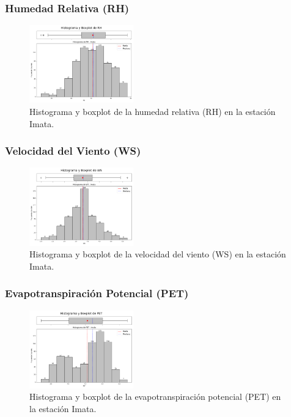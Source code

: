 \subsubsection*{Humedad Relativa (RH)}
\begin{figure}[H]
\centering
\includegraphics[width=0.4\textwidth]{resultados/por_estacion_meteorologica/Imata/RH_histograma.png}
\caption{Histograma y boxplot de la humedad relativa (RH) en la estación Imata.}
\label{fig:imata_RH}
\end{figure}

\subsubsection*{Velocidad del Viento (WS)}
\begin{figure}[H]
\centering
\includegraphics[width=0.4\textwidth]{resultados/por_estacion_meteorologica/Imata/WS_histograma.png}
\caption{Histograma y boxplot de la velocidad del viento (WS) en la estación Imata.}
\label{fig:imata_WS}
\end{figure}

\subsubsection*{Evapotranspiración Potencial (PET)}
\begin{figure}[H]
\centering
\includegraphics[width=0.4\textwidth]{resultados/por_estacion_meteorologica/Imata/PET_histograma.png}
\caption{Histograma y boxplot de la evapotranspiración potencial (PET) en la estación Imata.}
\label{fig:imata_PET}
\end{figure}

